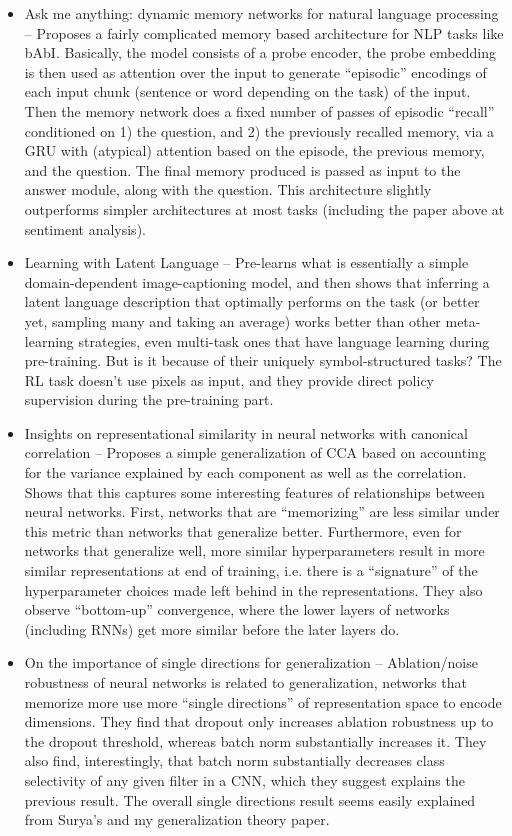 \documentclass[11pt]{article}
\begin{document}
\begin{itemize}
\item Ask me anything: dynamic memory networks for natural language processing -- Proposes a fairly complicated memory based architecture for NLP tasks like bAbI. Basically, the model consists of a probe encoder, the probe embedding is then used as attention over the input to generate ``episodic'' encodings of each input chunk (sentence or word depending on the task) of the input. Then the memory network does a fixed number of passes of episodic ``recall'' conditioned on 1) the question, and 2) the previously recalled memory, via a GRU with (atypical) attention based on the episode, the previous memory, and the question. The final memory produced is passed as input to the answer module, along with the question. This architecture slightly outperforms simpler architectures at most tasks (including the paper above at sentiment analysis). \citep{Kumar2015}
\item Learning with Latent Language -- Pre-learns what is essentially a simple domain-dependent image-captioning model, and then shows that inferring a latent language description that optimally performs on the task (or better yet, sampling many and taking an average) works better than other meta-learning strategies, even multi-task ones that have language learning during pre-training. But is it because of their uniquely symbol-structured tasks? The RL task doesn't use pixels as input, and they provide direct policy supervision during the pre-training part. \par 
\item Insights on representational similarity in neural networks with canonical correlation -- Proposes a simple generalization of CCA based on accounting for the variance explained by each component as well as the correlation. Shows that this captures some interesting features of relationships between neural networks. First, networks that are ``memorizing'' are less similar under this metric than networks that generalize better. Furthermore, even for networks that generalize well, more similar hyperparameters result in more similar representations at end of training, i.e. there is a ``signature'' of the hyperparameter choices made left behind in the representations. They also observe ``bottom-up'' convergence, where the lower layers of networks (including RNNs) get more similar before the later layers do.  
\item On the importance of single directions for generalization -- Ablation/noise robustness of neural networks is related to generalization, networks that memorize more use more ``single directions'' of representation space to encode dimensions. They find that dropout only increases ablation robustness up to the dropout threshold, whereas batch norm substantially increases it. They also find, interestingly, that batch norm substantially decreases class selectivity of any given filter in a CNN, which they suggest explains the previous result. The overall single directions result seems easily explained from Surya's and my generalization theory paper. \citep{Morcos2018}

\end{itemize}
\end{document}
